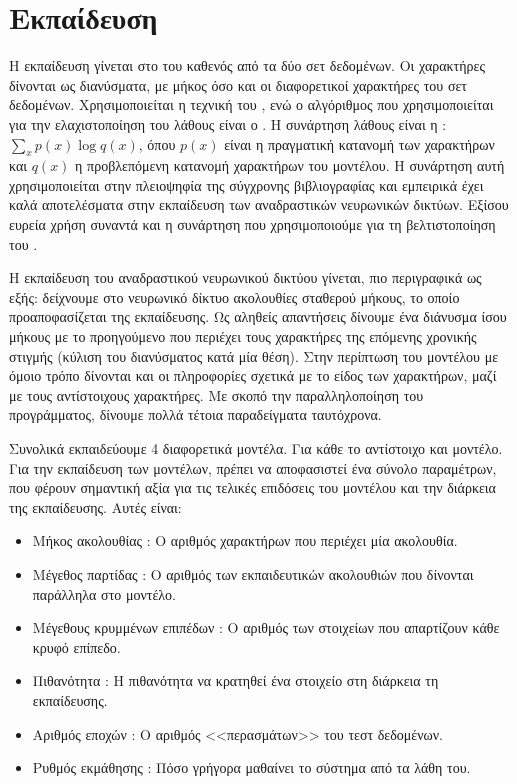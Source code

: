 \section{Εκπαίδευση}


Η εκπαίδευση γίνεται στο  του καθενός από τα δύο σετ δεδομένων. 
Οι χαρακτήρες δίνονται ως  διανύσματα, με μήκος όσο και οι διαφορετικοί χαρακτήρες του σετ δεδομένων.
Χρησιμοποιείται η τεχνική του , ενώ ο αλγόριθμος που χρησιμοποιείται για την ελαχιστοποίηση του λάθους είναι ο .
Η συνάρτηση λάθους είναι η : $\sum_x p(x) \log{q(x)}$, όπου $p(x)$ είναι η πραγματική κατανομή των χαρακτήρων και $q(x)$ η προβλεπόμενη κατανομή χαρακτήρων του μοντέλου.
Η συνάρτηση αυτή χρησιμοποιείται στην πλειοψηφία της σύγχρονης βιβλιογραφίας και εμπειρικά έχει καλά αποτελέσματα στην εκπαίδευση των αναδραστικών νευρωνικών δικτύων.
Εξίσου ευρεία χρήση συναντά και η συνάρτηση  που χρησιμοποιούμε για τη βελτιστοποίηση του .

Η εκπαίδευση του αναδραστικού νευρωνικού δικτύου γίνεται, πιο περιγραφικά ως εξής: δείχνουμε στο νευρωνικό δίκτυο ακολουθίες σταθερού μήκους, το οποίο προαποφασίζεται της εκπαίδευσης.
Ως αληθείς απαντήσεις δίνουμε ένα διάνυσμα ίσου μήκους με το προηγούμενο που περιέχει τους χαρακτήρες της επόμενης χρονικής στιγμής (κύλιση του διανύσματος κατά μία θέση).
Στην περίπτωση του μοντέλου   με όμοιο τρόπο δίνονται και οι πληροφορίες σχετικά με το είδος των χαρακτήρων, μαζί με τους αντίστοιχους χαρακτήρες.
Με σκοπό την παραλληλοποίηση του προγράμματος, δίνουμε πολλά τέτοια παραδείγματα ταυτόχρονα.

Συνολικά εκπαιδεύουμε 4 διαφορετικά μοντέλα. Για κάθε  το αντίστοιχο  και  μοντέλο.
Για την εκπαίδευση των μοντέλων, πρέπει να αποφασιστεί ένα σύνολο παραμέτρων, που φέρουν σημαντική αξία για τις τελικές επιδόσεις του μοντέλου και την διάρκεια της εκπαίδευσης. Αυτές είναι:

\begin{itemize} 
\item Μήκος ακολουθίας : Ο αριθμός χαρακτήρων που περιέχει μία ακολουθία.
\item Μέγεθος παρτίδας : Ο αριθμός των εκπαιδευτικών ακολουθιών που δίνονται παράλληλα στο μοντέλο.
\item Μέγεθους κρυμμένων επιπέδων : Ο αριθμός των στοιχείων  που απαρτίζουν κάθε κρυφό επίπεδο.
\item Πιθανότητα : Η πιθανότητα να κρατηθεί ένα στοιχείο στη διάρκεια τη εκπαίδευσης.
\item Αριθμός εποχών : Ο αριθμός <<περασμάτων>> του τεστ δεδομένων.
\item Ρυθμός εκμάθησης : Πόσο γρήγορα μαθαίνει το σύστημα από τα λάθη του.

\end{itemize}

